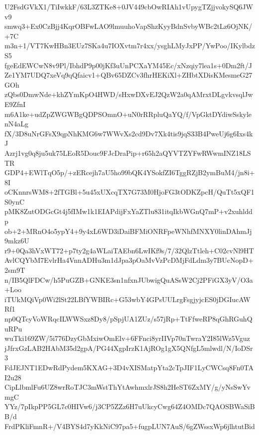 U2FsdGVkX1/TiIwkkF/63L3ZTKe8+0JV449cbOwRIAh1vUpygTZjjvokySQ6JWv9
smwq3+Ex0CzBjj4KqrOBFwLAO9lmuuhoVapShzKyyBdnSvbyWBc2tLz6OjNK/+7C
m3n+1/VT7KwHBn3EUz7SKa4u7IOXvtm7r4xx/ysghLMyJxPP/YwPoo/IKylbdzS5
fgeEdEWCwN8v9Pl/IbhdP9p00jKf3uUnPCXaYM45Ec/xNzqiy7lea1s+0Dm2ft/J
Ze1YM7UDQ7xeVq9qQfaicv1+QBv65DZCv3fhrHEKiXl+ZHbtXDisKMesmeG27GOh
zQbs0DmwNde+khZYmKpO4HWD/sHxwDXvEJ2QzW2a0qAMrxtDLgvkvsqlJwE9ZfnI
m6A1ke+udZpZWGWBgQDPSOmnO+uN0rRRpluQaYQ/f/VpGktDYdiwSskylenN4aLg
fX/3D8uNrGFsX9qpNhKMG6w7WWvXs2cd9Dv7Xk4tis9jqS33B4PweUj6g6Ixs4kJ
Azrj1vg0q8ju5uk75LEoR5Douc9FJcDraPip+r65h2aQYVTZYFwRWwmINZ18LSTR
GDP4+EWlTqO5p/+zERcejh7aU5ho99bQK4YSokfZI6TggRZjB2ymBuM4/jn8i+8I
oCKnnrsWM8+2fTGBl+5u45xUXcqTX7G73M0HjoFG3tODKZpcH/QuTt5xQF1S0ynC
pMK8ZutODGcGt4j5fIMw1k1EIAPdijFxYaZTlu831itqIkbWGnQ7mP+v2xuhlddp
ob+2+MRnO4o5ypY4+9y4xL6WD3iDaiBFMiONRFpeWNhfMNXY0linDAhmJj9mkz6U
r9+0Qa3hVxWT72+p7ty2g4aWLaiTAEbn6LwIKf9s/7/32QlzTtleh+C02cvNl9HT
AvlCQYbM7EvlrHa4VnnADHu3m1dJpa3pOaMvVzPcDMjFdLdm3y7BUcNopD+2sm9T
n/IB5QlFDCw/h5PuGZB+GNKE3sn1nfxnJUbwigQuASsW2Cj2PFiGX3yV/O3a+Loo
iTUkMQiVp0Wi2lSt22LBfYWBIRc+G53wbY4GPsUULrgFsgjyjcES0jDGIucAWRf1
np0QTcyVoWRqcILWWSxz8Dy8/pSpjUA1ZUz/s57jRp+TtFfweRP8qGhRGuhQuRPu
wuTki169ZW/5i776DzyGbMxiwOmElv+6FFnci8yrIIVp70nTwraY2I85lWz5Vguz
jJfrxGzLAB2HAbM35d2gpA/PG44XgpIrzK1AjROg1gX5QNfgL5mlwdl/N/IoDSr3
FdJEJNT1EDwRdPydem5KXAG+3D4vXISMatpYta2cTpJIF1LyCWCsq8Fn0TAI2u28
CipLlbmlFu6UZ8wrRoTJC3mWstThYtAwhmxlrJS8h2HeST6ZxMY/g/yNsSwYvmgC
YYz/7pIkpPP5GL7c0HIVw6/j3CP5ZZz6H7uUkcyCwg64Z4OMDc7QAOSBWaSiBB/d
FrdPKliFmnR+/V4BYS4d7yKkNiC97pa5+fugpLUN7AuS/6gZWssxWp6jlhtutBid
